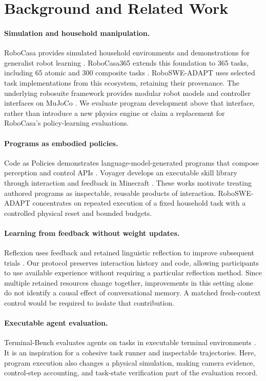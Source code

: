 \documentclass[11pt]{article}
\begin{document}
\section{Background and Related Work}
\paragraph{Simulation and household manipulation.}
RoboCasa provides simulated household environments and demonstrations for generalist robot learning \cite{robocasa2024}. RoboCasa365 extends this foundation to 365 tasks, including 65 atomic and 300 composite tasks \cite{robocasa365}. RoboSWE-ADAPT uses selected task implementations from this ecosystem, retaining their provenance. The underlying robosuite framework provides modular robot models and controller interfaces on MuJoCo \cite{robosuite}. We evaluate program development above that interface, rather than introduce a new physics engine or claim a replacement for RoboCasa's policy-learning evaluations.

\paragraph{Programs as embodied policies.}
Code as Policies demonstrates language-model-generated programs that compose perception and control APIs \cite{codepolicies}. Voyager develops an executable skill library through interaction and feedback in Minecraft \cite{voyager}. These works motivate treating authored programs as inspectable, reusable products of interaction. RoboSWE-ADAPT concentrates on repeated execution of a fixed household task with a controlled physical reset and bounded budgets.

\paragraph{Learning from feedback without weight updates.}
Reflexion uses feedback and retained linguistic reflection to improve subsequent trials \cite{reflexion}. Our protocol preserves interaction history and code, allowing participants to use available experience without requiring a particular reflection method. Since multiple retained resources change together, improvements in this setting alone do not identify a causal effect of conversational memory. A matched fresh-context control would be required to isolate that contribution.

\paragraph{Executable agent evaluation.}
Terminal-Bench evaluates agents on tasks in executable terminal environments \cite{terminalbench}. It is an inspiration for a cohesive task runner and inspectable trajectories. Here, program execution also changes a physical simulation, making camera evidence, control-step accounting, and task-state verification part of the evaluation record.
\end{document}
